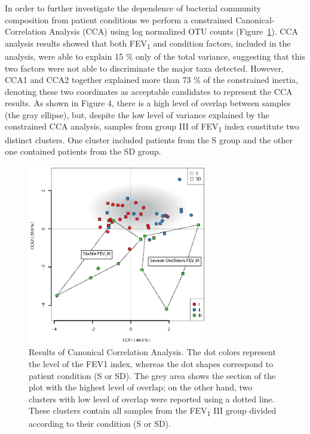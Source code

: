 In order to further investigate the dependence of bacterial community composition from patient conditions we perform a constrained Canonical-Correlation Analysis (CCA) using log normalized OTU counts (Figure~\ref{fig:fig416s}). CCA analysis results showed that both FEV\textsubscript{1} and condition factors, included in the analysis, were able to explain 15 \% only of the total variance, suggesting that this two factors were not able to discriminate the major taxa detected. However, CCA1 and CCA2 together explained more than 73 \% of the constrained inertia, denoting these two coordinates as acceptable candidates to represent the CCA results. As shown in Figure 4, there is a high level of overlap between samples (the gray ellipse), but, despite the low level of variance explained by the constrained CCA analysis, samples from group III of FEV\textsubscript{1} index constitute two distinct clusters. One cluster included patients from the S group and the other one contained patients from the SD group.\\
\begin{figure}[!tb]
	\centering
	\includegraphics[width=0.7\textwidth]{./figures/Chapter_7/Figure_4_16s}
  	\caption{\label{fig:fig416s}Results of Canonical Correlation Analysis. The dot colors represent the level of the FEV1 index, whereas the dot shapes correspond to patient condition (S or SD). The grey area shows the section of the plot with the highest level of overlap; on the other hand, two clusters with low level of overlap were reported using a dotted line. These clusters contain all samples from the FEV\textsubscript{1} III group divided according to their condition (S or SD).}
\end{figure}

